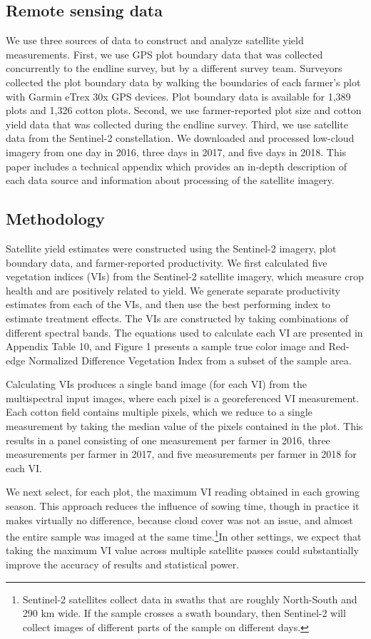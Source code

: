 \documentclass{article}
\begin{document}
\subsection{Remote sensing data}

We use three sources of data to construct and analyze satellite yield measurements. First, we use GPS plot boundary data that was collected concurrently to the endline survey, but by a different survey team. Surveyors collected the plot boundary data by walking the boundaries of each farmer’s plot with Garmin eTrex 30x GPS devices. Plot boundary data is available for 1,389 plots and 1,326 cotton plots. Second, we use farmer-reported plot size and cotton yield data that was collected during the endline survey. Third, we use satellite data from the Sentinel-2 constellation. We downloaded and processed low-cloud imagery from one day in 2016, three days in 2017, and five days in 2018. This paper includes a technical appendix which provides an in-depth description of each data source and information about processing of the satellite imagery.

\subsection{Methodology}

Satellite yield estimates were constructed using the Sentinel-2 imagery, plot boundary data, and farmer-reported productivity. We first calculated five vegetation indices (VIs) from the Sentinel-2 satellite imagery, which measure crop health and are positively related to yield. We generate separate productivity estimates from each of the VIs, and then use the best performing index to estimate treatment effects. The VIs are constructed by taking combinations of different spectral bands. The equations used to calculate each VI are presented in Appendix Table 10, and Figure 1 presents a sample true color image and Red-edge Normalized Difference Vegetation Index from a subset of the sample area. 

Calculating VIs produces a single band image (for each VI) from the multispectral input images, where each pixel is a georeferenced VI measurement. Each cotton field contains multiple pixels, which we reduce to a single measurement by taking the median value of the pixels contained in the plot. This results in a panel consisting of one measurement per farmer in 2016, three measurements per farmer in 2017, and five measurements per farmer in 2018 for each VI.  

We next select, for each plot, the maximum VI reading obtained in each growing season. This approach reduces the influence of sowing time, though in practice it makes virtually no difference, because cloud cover was not an issue, and almost the entire sample was imaged at the same time.\footnote{Sentinel-2 satellites collect data in swaths that are roughly North-South and 290 km wide. If the sample crosses a swath boundary, then Sentinel-2 will collect images of different parts of the sample on different days.}In other settings, we expect that taking the maximum VI value across multiple satellite passes could substantially improve the accuracy of results and statistical power.   
\end{document}
